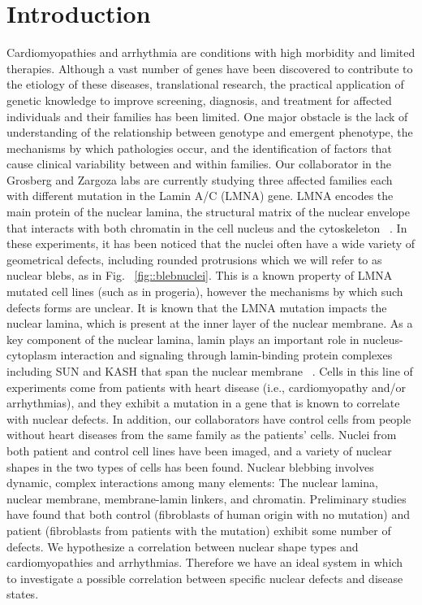 \section{Introduction}
Cardiomyopathies and arrhythmia are conditions with high morbidity and limited therapies. Although a vast number of genes have been discovered to contribute to the etiology of these diseases, translational research, the practical application of genetic knowledge to improve screening, diagnosis, and treatment for affected individuals and their families has been limited. One major obstacle is the lack of understanding of the relationship between genotype and emergent phenotype, the mechanisms by which pathologies occur, and the identification of factors that cause clinical variability between and within families. Our collaborator in the Grosberg and Zargoza labs are currently studying three affected families each with different mutation in the Lamin A/C (LMNA) gene.  LMNA encodes the main protein of the nuclear lamina, the structural matrix of the nuclear envelope that interacts with both chromatin in the cell nucleus and the cytoskeleton ~\cite{Capell2006}. In these experiments, it has been noticed that the nuclei often have a wide variety of geometrical defects, including rounded protrusions which we will refer to as nuclear blebs, as in Fig. ~\ref{fig::blebnuclei}. This is a known property of LMNA mutated cell lines (such as in progeria), however the mechanisms by which such defects forms are unclear. It is known that the LMNA mutation impacts the nuclear lamina, which is present at the inner layer of the nuclear membrane. As a key component of the nuclear lamina, lamin plays an important role in nucleus-cytoplasm interaction and signaling through lamin-binding protein complexes including SUN and KASH that span the nuclear membrane ~\cite{Ho2012}. Cells in this line of experiments come from patients with heart disease (i.e., cardiomyopathy and/or arrhythmias), and they exhibit a mutation in a gene that is known to correlate with nuclear defects. In addition, our collaborators have control cells from people without heart diseases from the same family as the patients' cells.  Nuclei from both patient and control cell lines have been imaged, and  a variety of nuclear shapes in the two types of cells has been found. Nuclear blebbing involves dynamic, complex interactions among many elements: The nuclear lamina, nuclear membrane, membrane-lamin linkers, and chromatin. Preliminary studies have found that both control (fibroblasts of human origin with no mutation) and patient (fibroblasts from patients with the mutation) exhibit some number of defects. We hypothesize a correlation between nuclear shape types and cardiomyopathies and arrhythmias. Therefore we have an ideal system in which to investigate a possible correlation between specific nuclear defects and disease states.

